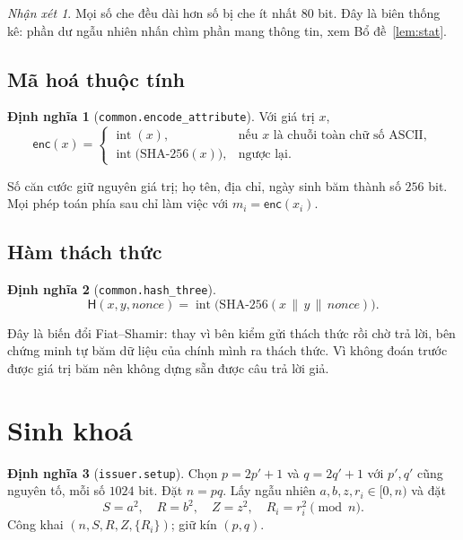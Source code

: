 \documentclass[a4paper,11pt]{article}
\theoremstyle{definition}
\newtheorem{definition}{Định nghĩa}[section]
\theoremstyle{plain}
\theoremstyle{remark}
\newtheorem*{remark}{Nhận xét}
\newcommand{\Hash}{\mathsf{H}}
\newcommand{\enc}{\mathsf{enc}}
\begin{document}
\begin{remark}
Mọi số che đều dài hơn số bị che ít nhất $80$ bit. Đây là biên thống kê: phần dư ngẫu
nhiên nhấn chìm phần mang thông tin, xem Bổ đề~\ref{lem:stat}.
\end{remark}

\subsection{Mã hoá thuộc tính}

\begin{definition}[\texttt{common.encode\_attribute}]
Với giá trị $x$,
\[
\enc(x)=
\begin{cases}
\operatorname{int}(x), & \text{nếu } x \text{ là chuỗi toàn chữ số ASCII},\\[2pt]
\operatorname{int}\bigl(\mathrm{SHA\text{-}256}(x)\bigr), & \text{ngược lại.}
\end{cases}
\]
\end{definition}

\noindent Số căn cước giữ nguyên giá trị; họ tên, địa chỉ, ngày sinh băm thành số $256$
bit. Mọi phép toán phía sau chỉ làm việc với $m_i=\enc(x_i)$.

\subsection{Hàm thách thức}

\begin{definition}[\texttt{common.hash\_three}]
\[
\Hash(x,y,\mathit{nonce})=\operatorname{int}\bigl(\mathrm{SHA\text{-}256}(x \,\|\, y \,\|\, \mathit{nonce})\bigr).
\]
\end{definition}

\noindent Đây là biến đổi Fiat--Shamir: thay vì bên kiểm gửi thách thức rồi chờ trả lời,
bên chứng minh tự băm dữ liệu của chính mình ra thách thức. Vì không đoán trước được giá
trị băm nên không dựng sẵn được câu trả lời giả.

\section{Sinh khoá}

\begin{definition}[\texttt{issuer.setup}]
Chọn $p=2p'+1$ và $q=2q'+1$ với $p',q'$ cũng nguyên tố, mỗi số $1024$ bit. Đặt $n=pq$.
Lấy ngẫu nhiên $a,b,z,r_i \in [0,n)$ và đặt
\[
S=a^2,\quad R=b^2,\quad Z=z^2,\quad R_i=r_i^2 \pmod n .
\]
Công khai $(n,S,R,Z,\{R_i\})$; giữ kín $(p,q)$.
\end{definition}
\end{document}
